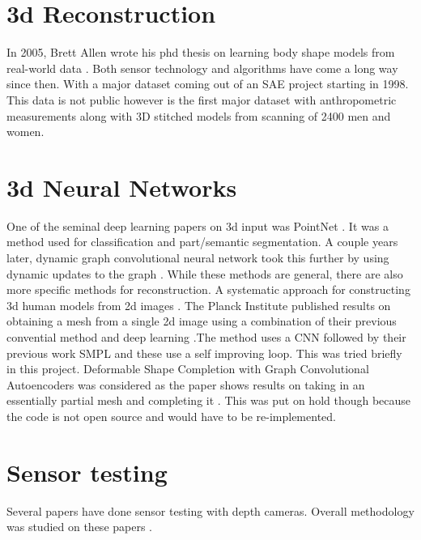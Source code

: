 \section{3d Reconstruction}
In 2005, Brett Allen wrote his phd thesis on learning body shape models from real-world data \cite{allen2005learning}. Both sensor technology and algorithms have come a long way since then. With a major dataset coming out of an SAE project starting in 1998. This data is not public however is the first major dataset with anthropometric measurements along with 3D stitched models from scanning of 2400 men and women.

\section{3d Neural Networks}
One of the seminal deep learning papers on 3d input was PointNet \cite{DBLP:journals/corr/QiSMG16}. It was a method used for classification and part/semantic segmentation. A couple years later, dynamic graph convolutional neural network took this further by using dynamic updates to the graph \cite{DBLP:journals/corr/abs-1801-07829}. While these methods are general, there are also more specific methods for reconstruction. A systematic approach for constructing 3d human models from 2d images \cite{5645897}. The Planck Institute published results on obtaining a mesh from a single 2d image using a combination of their previous convential method and deep learning \cite{kolotouros2019learning}.The method uses a CNN followed by their previous work SMPL and these use a self improving loop. This was tried briefly in this project. Deformable Shape Completion with Graph Convolutional Autoencoders was considered as the paper shows results on taking in an essentially partial mesh and completing it \cite{litany2018deformable}. This was put on hold though because the code is not open source and would have to be re-implemented. 

\section{Sensor testing}
Several papers have done sensor testing with depth cameras. Overall methodology was studied on these papers \cite{sophian2017evaluation} \cite{khoshelham2012accuracy} \cite{langmann2012depth} \cite{sankowski2017estimation}.


